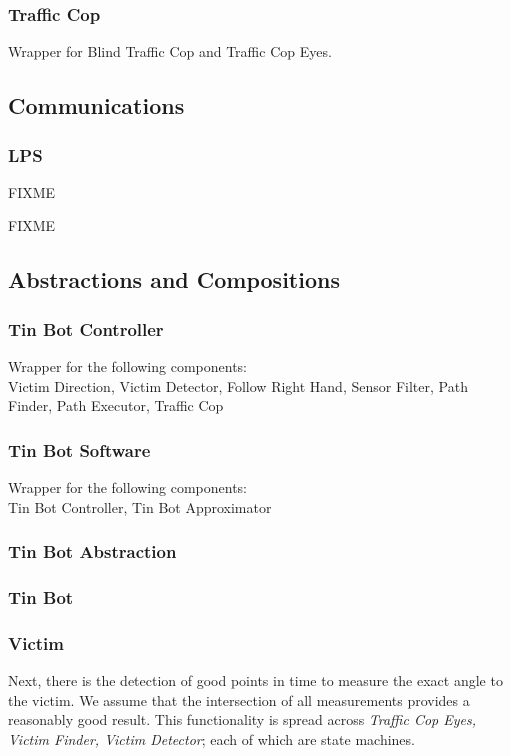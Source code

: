 \documentclass[a4paper,parskip,headheight=38pt]{scrartcl} %
\begin{document}
\subsubsection{Traffic Cop}

Wrapper for Blind Traffic Cop and Traffic Cop Eyes.

\subsection{Communications}

\subsubsection{LPS}

FIXME

FIXME

\subsection{Abstractions and Compositions}
\subsubsection{Tin Bot Controller}

Wrapper for the following components: \\
Victim Direction, Victim Detector, Follow Right Hand, Sensor Filter, Path Finder, Path Executor, Traffic Cop

\subsubsection{Tin Bot Software}

Wrapper for the following components: \\
Tin Bot Controller, Tin Bot Approximator

\subsubsection{Tin Bot Abstraction}
\subsubsection{Tin Bot}
\subsubsection{Victim}



Next, there is the detection of good points in time to measure the exact angle to the victim.  We assume that the intersection of all measurements provides a reasonably good result.  This functionality is spread across \emph{Traffic Cop Eyes, Victim Finder, Victim Detector}; each of which are state machines.
\end{document}
